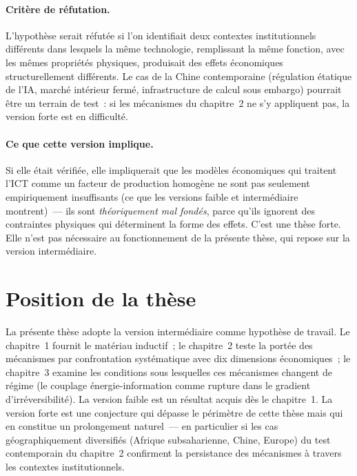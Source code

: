 \paragraph{Critère de réfutation.} L'hypothèse serait réfutée si l'on identifiait deux contextes institutionnels différents dans lesquels la même technologie, remplissant la même fonction, avec les mêmes propriétés physiques, produisait des effets économiques structurellement différents. Le cas de la Chine contemporaine (régulation étatique de l'IA, marché intérieur fermé, infrastructure de calcul sous embargo) pourrait être un terrain de test~: si les mécanismes du chapitre~2 ne s'y appliquent pas, la version forte est en difficulté.

\paragraph{Ce que cette version implique.} Si elle était vérifiée, elle impliquerait que les modèles économiques qui traitent l'ICT comme un facteur de production homogène ne sont pas seulement empiriquement insuffisants (ce que les versions faible et intermédiaire montrent)~--- ils sont \emph{théoriquement mal fondés}, parce qu'ils ignorent des contraintes physiques qui déterminent la forme des effets. C'est une thèse forte. Elle n'est pas nécessaire au fonctionnement de la présente thèse, qui repose sur la version intermédiaire.

\section{Position de la thèse}

La présente thèse adopte la version intermédiaire comme hypothèse de travail. Le chapitre~1 fournit le matériau inductif~; le chapitre~2 teste la portée des mécanismes par confrontation systématique avec dix dimensions économiques~; le chapitre~3 examine les conditions sous lesquelles ces mécanismes changent de régime (le couplage énergie-information comme rupture dans le gradient d'irréversibilité). La version faible est un résultat acquis dès le chapitre~1. La version forte est une conjecture qui dépasse le périmètre de cette thèse mais qui en constitue un prolongement naturel~--- en particulier si les cas géographiquement diversifiés (Afrique subsaharienne, Chine, Europe) du test contemporain du chapitre~2 confirment la persistance des mécanismes à travers les contextes institutionnels.
